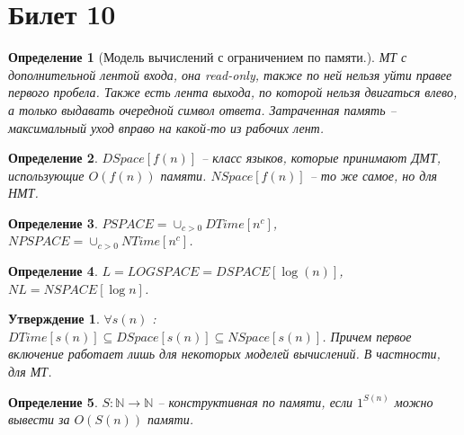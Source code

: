 \documentclass[12pt, letterpaper]{article}
\newtheorem{prop}{Утверждение}[section]
\newtheorem{defi}{Определение}[section]
\newcommand{\N}{\mathbb{N}}
\begin{document}
\section{Билет 10}	
\begin{defi}[Модель вычислений с ограничением по памяти.]
 МТ с дополнительной лентой входа, она read-only, также по ней нельзя уйти правее первого пробела. Также есть лента выхода, по которой нельзя двигаться влево, а только выдавать очередной символ ответа. Затраченная память -- максимальный уход вправо на какой-то из рабочих лент.
\end{defi}

\begin{defi}
$DSpace[f(n)]$ -- класс языков, которые принимают ДМТ, использующие $O(f(n))$ памяти. $NSpace[f(n)]$ -- то же самое, но для НМТ.
\end{defi}

\begin{defi}
$PSPACE = \cup_{c>0} DTime[n^c]$, $NPSPACE = \cup_{c>0} NTime[n^c]$.
\end{defi}

\begin{defi}
$L = LOGSPACE = DSPACE[\log(n)]$, $NL = NSPACE[\log n]$.
\end{defi}

\begin{prop}
$\forall s(n)$ : $DTime[s(n)] \subseteq DSpace[s(n)] \subseteq NSpace[s(n)]$.
Причем первое включение работает лишь для некоторых моделей вычислений. В частности, для МТ.
\end{prop}

\begin{defi}
$S : \N \rightarrow \N$ -- конструктивная по памяти, если $1^{S(n)}$ можно вывести за $O(S(n))$ памяти.
\end{defi}
\end{document}
